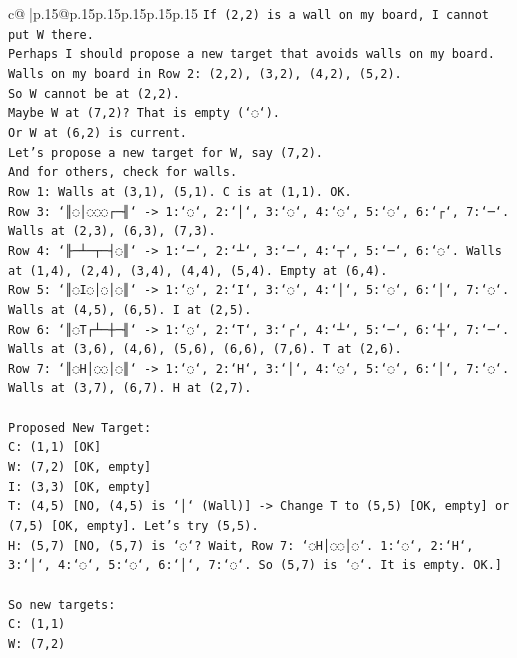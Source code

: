 \documentclass{article}
\begin{document}
{\begin{supertabular}{c@{$\;$}|p{.15\linewidth}@{}p{.15\linewidth}p{.15\linewidth}p{.15\linewidth}p{.15\linewidth}p{.15\linewidth}}
{{{\texttt{If (2,2) is a wall on my board, I cannot put W there.} \\
\texttt{Perhaps I should propose a new target that avoids walls on my board.} \\
\texttt{Walls on my board in Row 2: (2,2), (3,2), (4,2), (5,2).} \\
\texttt{So W cannot be at (2,2).} \\
\texttt{Maybe W at (7,2)? That is empty (`◌`).} \\
\texttt{Or W at (6,2) is current.} \\
\texttt{Let's propose a new target for W, say (7,2).} \\
\texttt{And for others, check for walls.} \\
\texttt{Row 1: Walls at (3,1), (5,1). C is at (1,1). OK.} \\
\texttt{Row 3: `║◌│◌◌◌┌─╢` {-}> 1:`◌`, 2:`│`, 3:`◌`, 4:`◌`, 5:`◌`, 6:`┌`, 7:`─`. Walls at (2,3), (6,3), (7,3).} \\
\texttt{Row 4: `╟─┴─┬─┤◌║` {-}> 1:`─`, 2:`┴`, 3:`─`, 4:`┬`, 5:`─`, 6:`◌`. Walls at (1,4), (2,4), (3,4), (4,4), (5,4). Empty at (6,4).} \\
\texttt{Row 5: `║◌I◌│◌│◌║` {-}> 1:`◌`, 2:`I`, 3:`◌`, 4:`│`, 5:`◌`, 6:`│`, 7:`◌`. Walls at (4,5), (6,5). I at (2,5).} \\
\texttt{Row 6: `║◌T┌┴─┼─╢` {-}> 1:`◌`, 2:`T`, 3:`┌`, 4:`┴`, 5:`─`, 6:`┼`, 7:`─`. Walls at (3,6), (4,6), (5,6), (6,6), (7,6). T at (2,6).} \\
\texttt{Row 7: `║◌H│◌◌│◌║` {-}> 1:`◌`, 2:`H`, 3:`│`, 4:`◌`, 5:`◌`, 6:`│`, 7:`◌`. Walls at (3,7), (6,7). H at (2,7).} \\
\\ 
\texttt{Proposed New Target:} \\
\texttt{C: (1,1) {[}OK{]}} \\
\texttt{W: (7,2) {[}OK, empty{]}} \\
\texttt{I: (3,3) {[}OK, empty{]}} \\
\texttt{T: (4,5) {[}NO, (4,5) is `│` (Wall){]} {-}> Change T to (5,5) {[}OK, empty{]} or (7,5) {[}OK, empty{]}. Let's try (5,5).} \\
\texttt{H: (5,7) {[}NO, (5,7) is `◌`? Wait, Row 7: `◌H│◌◌│◌`. 1:`◌`, 2:`H`, 3:`│`, 4:`◌`, 5:`◌`, 6:`│`, 7:`◌`. So (5,7) is `◌`. It is empty. OK.{]}} \\
\\ 
\texttt{So new targets:} \\
\texttt{C: (1,1)} \\
\texttt{W: (7,2)} \\
}}}
\end{supertabular}}
\end{document}
